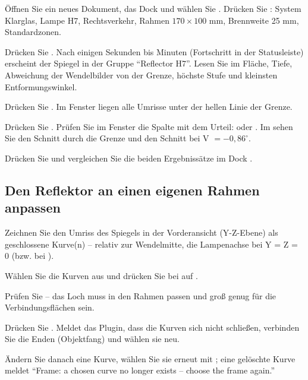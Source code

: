 \begin{schritte}
  \item Öffnen Sie ein neues Dokument, das Dock  und wählen Sie . Drücken Sie : System Klarglas, Lampe H7, Rechtsverkehr,
    Rahmen $170 \times 100$ mm, Brennweite 25 mm, Standardzonen.
  \item Drücken Sie . Nach einigen Sekunden bis Minuten (Fortschritt in der
    Statusleiste) erscheint der Spiegel in der Gruppe \enquote{Reflector H7}. Lesen Sie im  Fläche, Tiefe, Abweichung der Wendelbilder von der Grenze, höchste Stufe und kleinsten
    Entformungswinkel.
  \item Drücken Sie . Im Fenster  liegen alle Umrisse unter der
    hellen Linie der Grenze.
  \item Drücken Sie . Prüfen Sie im Fenster  die Spalte mit dem
    Urteil:  oder . Im  sehen Sie den Schnitt durch die Grenze und den
    Schnitt bei V $= -0{,}86^\circ$.
  \item Drücken Sie  und vergleichen Sie die beiden
    Ergebnissätze im Dock .
\end{schritte}

\subsection{Den Reflektor an einen eigenen Rahmen anpassen}

\begin{schritte}
  \item Zeichnen Sie den Umriss des Spiegels in der Vorderansicht (Y-Z-Ebene) als geschlossene
    Kurve(n) -- relativ zur Wendelmitte, die Lampenachse bei Y = Z = 0 (bzw. bei ).
  \item Wählen Sie die Kurven aus und drücken Sie bei  auf .
  \item Prüfen Sie  -- das Loch muss in den Rahmen passen und groß genug für
    die Verbindungsflächen sein.
  \item Drücken Sie . Meldet das Plugin, dass die Kurven sich nicht schließen,
    verbinden Sie die Enden (Objektfang) und wählen sie neu.
  \item Ändern Sie danach eine Kurve, wählen Sie sie erneut mit ; eine gelöschte
    Kurve meldet \enquote{Frame: a chosen curve no longer exists – choose the frame again.}
\end{schritte}

